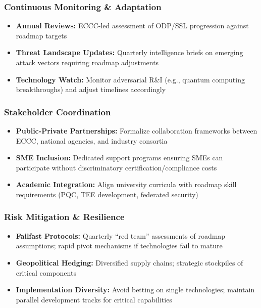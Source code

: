 \documentclass[12pt,a4paper]{article}
\begin{document}
\subsubsection*{Continuous Monitoring \& Adaptation}
\begin{itemize}
    \item \textbf{Annual Reviews:} ECCC-led assessment of ODP/SSL progression against roadmap targets
    \item \textbf{Threat Landscape Updates:} Quarterly intelligence briefs on emerging attack vectors requiring roadmap adjustments
    \item \textbf{Technology Watch:} Monitor adversarial R\&I (e.g., quantum computing breakthroughs) and adjust timelines accordingly
\end{itemize}

\subsubsection*{Stakeholder Coordination}
\begin{itemize}
    \item \textbf{Public-Private Partnerships:} Formalize collaboration frameworks between ECCC, national agencies, and industry consortia
    \item \textbf{SME Inclusion:} Dedicated support programs ensuring SMEs can participate without discriminatory certification/compliance costs
    \item \textbf{Academic Integration:} Align university curricula with roadmap skill requirements (PQC, TEE development, federated security)
\end{itemize}

\subsubsection*{Risk Mitigation \& Resilience}
\begin{itemize}
    \item \textbf{Failfast Protocols:} Quarterly ``red team''  assessments of roadmap assumptions; rapid pivot mechanisms if technologies fail to mature
    \item \textbf{Geopolitical Hedging:} Diversified supply chains; strategic stockpiles of critical components
    \item \textbf{Implementation Diversity:} Avoid betting on single technologies; maintain parallel development tracks for critical capabilities
\end{itemize}
\end{document}
